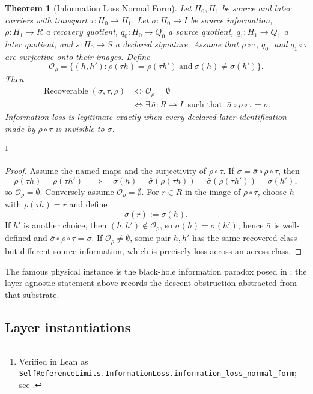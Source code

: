 \documentclass[11pt]{article}
\newtheorem{theorem}{Theorem}[section]
\theoremstyle{definition}
\begin{document}
\begin{theorem}[Information Loss Normal Form]\label{thm:F34}
Let \(H_0,H_1\) be source and later carriers with transport
\(\tau:H_0\to H_1\). Let \(\sigma:H_0\to I\) be source information,
\(\rho:H_1\to R\) a recovery quotient, \(q_0:H_0\to Q_0\) a source
quotient, \(q_1:H_1\to Q_1\) a later quotient, and
\(s:H_0\to S\) a declared signature. Assume that
\(\rho\circ\tau\), \(q_0\), and \(q_1\circ\tau\) are surjective onto
their images. Define
\[
  \mathcal O_\rho
  =\{(h,h'):\rho(\tau h)=\rho(\tau h')\ \text{and}\
      \sigma(h)\ne\sigma(h')\}.
\]
Then
\begin{align*}
  \operatorname{Recoverable}(\sigma,\tau,\rho)
  &\iff \mathcal O_\rho=\emptyset\\
  &\iff
  \exists\,\bar\sigma:R\to I\ \text{ such that }\
    \bar\sigma\circ\rho\circ\tau=\sigma .
\end{align*}
Information loss is legitimate exactly when every declared later
identification made by \(\rho\circ\tau\) is invisible to \(\sigma\).
\end{theorem}
\footnote{\raggedright Verified in Lean as
\texttt{SelfReferenceLimits.\allowbreak{}InformationLoss.\allowbreak{}information\_loss\_normal\_form};
see \Cref{app:formalization}.}
\begin{proof}
Assume the named maps and the surjectivity of \(\rho\circ\tau\). If
\(\sigma=\bar\sigma\circ\rho\circ\tau\), then
\[
  \rho(\tau h)=\rho(\tau h')
  \quad\Longrightarrow\quad
  \sigma(h)=\bar\sigma(\rho(\tau h))
           =\bar\sigma(\rho(\tau h'))=\sigma(h'),
\]
so \(\mathcal O_\rho=\emptyset\). Conversely assume
\(\mathcal O_\rho=\emptyset\). For \(r\in R\) in the image of
\(\rho\circ\tau\), choose \(h\) with \(\rho(\tau h)=r\) and define
\[
  \bar\sigma(r):=\sigma(h).
\]
If \(h'\) is another choice, then \((h,h')\notin\mathcal O_\rho\), so
\(\sigma(h)=\sigma(h')\); hence \(\bar\sigma\) is well-defined and
\(\bar\sigma\circ\rho\circ\tau=\sigma\). If
\(\mathcal O_\rho\ne\emptyset\), some pair \(h,h'\) has the same
recovered class but different source information, which is precisely
loss across an access class.
\end{proof}

The famous physical instance is the black-hole information paradox
posed in \citet{Hawking1976BHThermodynamics}; the layer-agnostic
statement above records the descent obstruction abstracted from
that substrate.

\subsection*{Layer instantiations}\label{layer-inst:F34}
\end{document}
